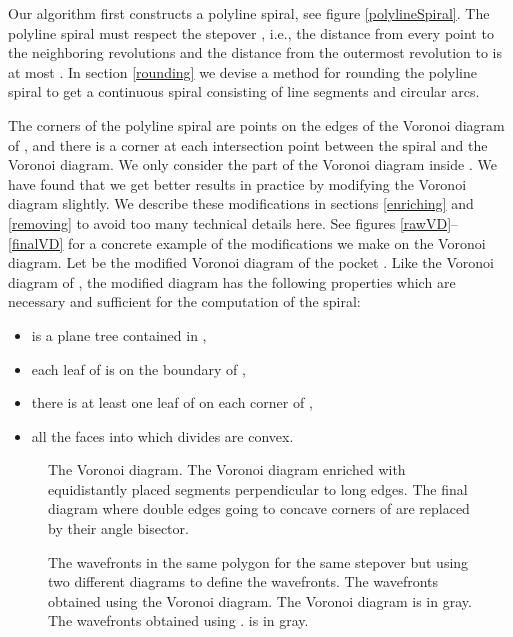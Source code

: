 \documentclass[3p]{elsarticle}
\begin{document}
Our algorithm first constructs a polyline spiral, see figure \ref{polylineSpiral}.
The polyline spiral must respect the stepover , i.e.,
the distance from every point to the neighboring revolutions
and the distance from the outermost revolution to 
is at most .
In section \ref{rounding}
we devise a method for rounding the polyline spiral to get a  continuous spiral
consisting of line segments
and circular arcs. 

The corners of the
polyline spiral are points on the edges of the Voronoi diagram of , and there
is a corner at each intersection point between the spiral and the Voronoi diagram.
We only consider the part of the Voronoi diagram inside . We have found
that we get better results in practice by modifying the Voronoi diagram slightly.
We describe these modifications in sections \ref{enriching} and \ref{removing}
to avoid too many technical details here.
See figures \ref{rawVD}--\ref{finalVD} for a concrete example of the modifications
we make on the Voronoi diagram.
Let  be the modified Voronoi diagram of the pocket . 
Like the Voronoi diagram of , the modified diagram
 has the following properties which are necessary and sufficient for
the computation of the spiral:
\begin{itemize}
\setlength\itemsep{0em}
\item  is a plane tree contained in ,
\item each leaf of  is on the boundary  of ,
\item there is at least one leaf of  on each corner of ,
\item all the faces into which  divides  are convex.
\end{itemize}

\begin{figure*}
\centering
{}\quad
{}
\caption{ The Voronoi diagram.
 The Voronoi diagram enriched with equidistantly placed
segments perpendicular to long edges.
 The final diagram  where double edges going to concave corners
of  are replaced by their angle bisector.
}
\end{figure*}

\begin{figure*}
\centering
{}\quad
{}
\caption{The wavefronts in the same polygon  for the same stepover 
but using two different diagrams to define the wavefronts.
 The wavefronts obtained using the Voronoi diagram. The Voronoi
diagram is in gray.
 The wavefronts obtained using .  is in gray.
}
\label{wavefronts}
\end{figure*}
\end{document}
